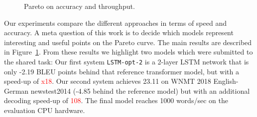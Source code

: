 \documentclass[11pt,a4paper]{article}
\begin{document}
\begin{figure}
\caption{Pareto on accuracy and throughput.}
\label{fig:pareto}
\end{figure}

Our experiments compare the different approaches in terms of speed and
accuracy. A meta question of this work is to decide which models
represent interesting and useful points on the Pareto curve. The main
results are described in Figure~\ref{fig:pareto}.  From these results
we highlight two models which were submitted to the shared task: Our
first system {\tt LSTM-opt-2} is a 2-layer LSTM network that is only
-2.19 BLEU points behind that reference transformer model, but with a
speed-up of \textcolor{red}{x18}. Our second system achieves 23.11 on
WNMT 2018 English-German newstest2014 (-4.85 behind the reference
model) but with an additional decoding speed-up of \textcolor{red}{108}.
The final model reaches 1000 words/sec on the evaluation CPU hardware.

\end{document}
